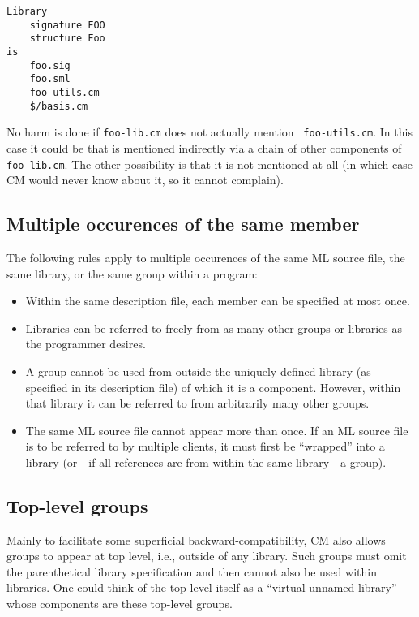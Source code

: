 \documentclass[titlepage,letterpaper]{article}
\begin{document}
\begin{verbatim}
Library
    signature FOO
    structure Foo
is
    foo.sig
    foo.sml
    foo-utils.cm
    $/basis.cm
\end{verbatim}

No harm is done if {\tt foo-lib.cm} does not actually mention {\tt
foo-utils.cm}.  In this case it could be that is mentioned indirectly via a chain of other components
of {\tt foo-lib.cm}.  The other possibility is that it is not
mentioned at all (in which case CM would never know about it, so it
cannot complain).

\subsection{Multiple occurences of the same member}
\label{sec:multioccur}

The following rules apply to multiple occurences of the same ML source
file, the same library, or the same group within a program:

\begin{itemize}
\item Within the same description file, each member can be specified
at most once.
\item Libraries can be referred to freely from as many other groups or
libraries as the programmer desires.
\item A group cannot be used from outside the uniquely defined library
(as specified in its description file) of which it is a component.
However, within that library it can be referred to from arbitrarily
many other groups.
\item The same ML source file cannot appear more than once.  If an ML
source file is to be referred to by multiple clients, it must first be
``wrapped'' into a library (or---if all references are from within the
same library---a group).
\end{itemize}

\subsection{Top-level groups}

Mainly to facilitate some superficial backward-compatibility, CM also
allows groups to appear at top level, i.e., outside of any library.
Such groups must omit the parenthetical library specification and then
cannot also be used within libraries. One could think of the top level
itself as a ``virtual unnamed library'' whose components are these
top-level groups.
\end{document}
